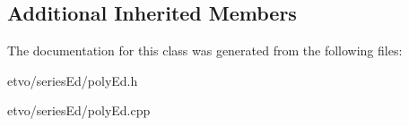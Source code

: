 \subsection*{Additional Inherited Members}


The documentation for this class was generated from the following files\+:\begin{DoxyCompactItemize}
\item 
etvo/series\+Ed/poly\+Ed.\+h\item 
etvo/series\+Ed/poly\+Ed.\+cpp\end{DoxyCompactItemize}
